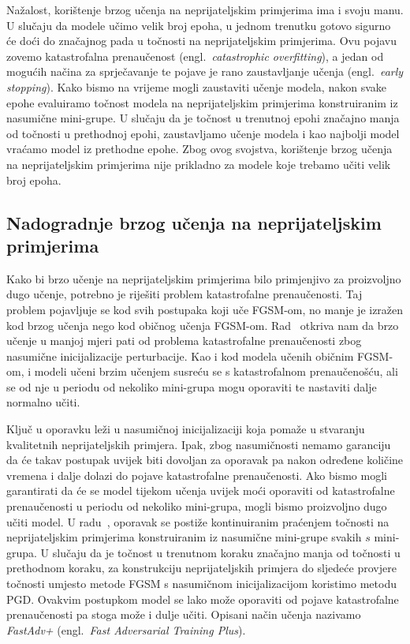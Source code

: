\documentclass[times, utf8, zavrsni, numeric]{fer}
\begin{document}
Nažalost, korištenje brzog učenja na neprijateljskim primjerima ima i svoju manu. U slučaju da modele učimo velik broj epoha,
u jednom trenutku gotovo sigurno će doći do značajnog pada u točnosti na neprijateljskim primjerima. Ovu pojavu zovemo katastrofalna prenaučenost (engl.\ \textit{catastrophic overfitting}),
a jedan od mogućih načina za sprječavanje te pojave je rano zaustavljanje učenja (engl.\ \textit{early stopping}). 
Kako bismo na vrijeme mogli zaustaviti učenje modela, nakon svake epohe evaluiramo točnost modela na neprijateljskim primjerima konstruiranim iz nasumične mini-grupe.
U slučaju da je točnost u trenutnoj epohi značajno manja od točnosti u prethodnoj epohi, zaustavljamo učenje modela i kao najbolji model vraćamo model iz prethodne epohe.
Zbog ovog svojstva, korištenje brzog učenja na neprijateljskim primjerima nije prikladno za modele koje trebamo učiti velik broj epoha.

\subsection{Nadogradnje brzog učenja na neprijateljskim primjerima}

Kako bi brzo učenje na neprijateljskim primjerima bilo primjenjivo za proizvoljno dugo učenje, potrebno je riješiti problem katastrofalne prenaučenosti.
Taj problem pojavljuje se kod svih postupaka koji uče FGSM-om, no manje je izražen kod brzog učenja nego kod običnog učenja FGSM-om.
Rad~\cite{li2020towards} otkriva nam da brzo učenje u manjoj mjeri pati od problema katastrofalne prenaučenosti zbog nasumične inicijalizacije perturbacije.
Kao i kod modela učenih običnim FGSM-om, i modeli učeni brzim učenjem susreću se s katastrofalnom prenaučenošću, ali se od nje u periodu od nekoliko mini-grupa mogu oporaviti te nastaviti dalje normalno učiti.

Ključ u oporavku leži u nasumičnoj inicijalizaciji koja pomaže u stvaranju kvalitetnih neprijateljskih primjera. 
Ipak, zbog nasumičnosti nemamo garanciju da će takav postupak uvijek biti dovoljan za oporavak pa nakon određene količine vremena i dalje dolazi do pojave katastrofalne prenaučenosti.
Ako bismo mogli garantirati da će se model tijekom učenja uvijek moći oporaviti od katastrofalne prenaučenosti u periodu od nekoliko mini-grupa, mogli bismo proizvoljno dugo učiti model.
U radu~\cite{li2020towards}, oporavak se postiže kontinuiranim praćenjem točnosti na neprijateljskim primjerima konstruiranim iz nasumične mini-grupe svakih $s$ mini-grupa. 
U slučaju da je točnost u trenutnom koraku značajno manja od točnosti u prethodnom koraku, za konstrukciju neprijateljskih primjera do sljedeće provjere točnosti umjesto metode FGSM s nasumičnom inicijalizacijom koristimo metodu PGD.
Ovakvim postupkom model se lako može oporaviti od pojave katastrofalne prenaučenosti pa stoga može i dulje učiti.
Opisani način učenja nazivamo \textit{FastAdv+} (engl.\ \textit{Fast Adversarial Training Plus}).
\end{document}
